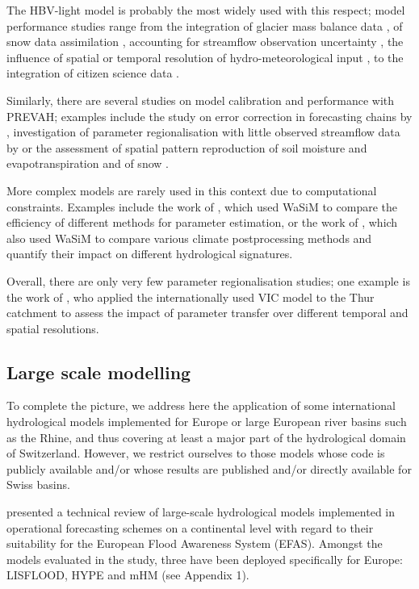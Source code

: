 \documentclass[10pt,a4paper]{article}
\begin{document}
The HBV-light model is probably the most widely used with this respect;
model performance studies range from the integration of glacier mass
balance data \citep{Finger2015,schaeflihuss11}, of snow data
assimilation \citep{Griessinger2016}, accounting for streamflow observation
uncertainty \citep{Westerberg2020}, the influence of spatial or temporal
resolution of hydro-meteorological input \citep{GironsLopez2016,Sikorska2018}, to the
integration of citizen science data \citep{Etter2020}.

Similarly, there are several studies on model calibration and
performance with PREVAH; examples include the study on error correction
in forecasting chains by \citet{Bogner_2018}, investigation of parameter
regionalisation with little observed streamflow data
by \citet{Viviroli2015} or the assessment of spatial pattern reproduction
of soil moisture and evapotranspiration \citep{Zappa2003} and of snow
\citep{Zappa2008a}.

More complex models are rarely used in this context due to computational
constraints. Examples include the work of \citet{Cullmann2011}, which
used WaSiM to compare the efficiency of different methods for
parameter estimation, or the work of \citet{Rossler2019}, which also
used WaSiM to compare various climate postprocessing methods and
quantify their impact on different hydrological signatures. 

Overall, there are only very few parameter regionalisation studies; one
example is the work of \citet{Melsen2016}, who applied the
internationally used VIC model to the Thur catchment to assess the
impact of parameter transfer over different temporal and spatial
resolutions.

\subsection{Large scale modelling}
\label{sec:application:largescale}

To complete the picture, we address here the application of some
international hydrological models implemented for Europe or large
European river basins such as the Rhine, and thus covering at least a
major part of the hydrological domain of Switzerland. However, we
restrict ourselves to those models whose code is publicly available
and/or whose results are published and/or directly available for Swiss
basins. 

\citet{Kauffeldt_2016} presented a technical review of large-scale
hydrological models implemented in operational forecasting schemes on a
continental level with regard to their suitability for the European
Flood Awareness System (EFAS). Amongst the models evaluated in the
study, three have been deployed specifically for Europe: LISFLOOD, HYPE
and mHM (see Appendix 1).
\end{document}
